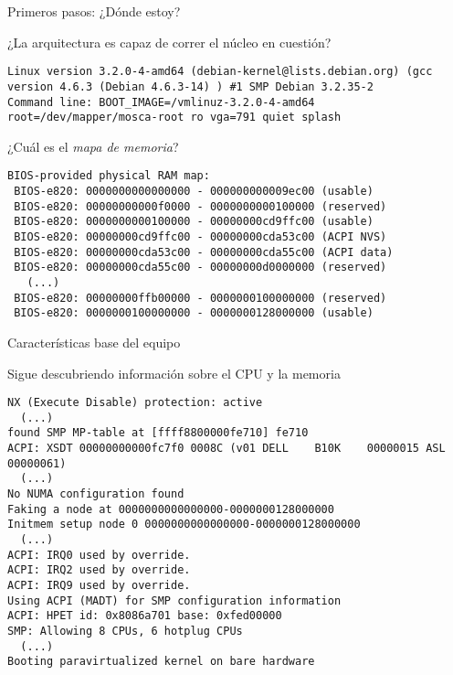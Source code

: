 \documentclass[presentation]{beamer}
\begin{document}
\begin{frame}[label={sec:org8016288},fragile]{Primeros pasos: ¿Dónde estoy?}
 \begin{center}
¿La arquitectura es capaz de correr el núcleo en cuestión?
\end{center}
\begin{verbatim}
Linux version 3.2.0-4-amd64 (debian-kernel@lists.debian.org) (gcc version 4.6.3 (Debian 4.6.3-14) ) #1 SMP Debian 3.2.35-2
Command line: BOOT_IMAGE=/vmlinuz-3.2.0-4-amd64 root=/dev/mapper/mosca-root ro vga=791 quiet splash
\end{verbatim}
\begin{center}
¿Cuál es el \emph{mapa de memoria}?
\end{center}
\begin{verbatim}
BIOS-provided physical RAM map:
 BIOS-e820: 0000000000000000 - 000000000009ec00 (usable)
 BIOS-e820: 00000000000f0000 - 0000000000100000 (reserved)
 BIOS-e820: 0000000000100000 - 00000000cd9ffc00 (usable)
 BIOS-e820: 00000000cd9ffc00 - 00000000cda53c00 (ACPI NVS)
 BIOS-e820: 00000000cda53c00 - 00000000cda55c00 (ACPI data)
 BIOS-e820: 00000000cda55c00 - 00000000d0000000 (reserved)
   (...)
 BIOS-e820: 00000000ffb00000 - 0000000100000000 (reserved)
 BIOS-e820: 0000000100000000 - 0000000128000000 (usable)
\end{verbatim}
\end{frame}

\begin{frame}[label={sec:orge6c693b},fragile]{Características base del equipo}
 \begin{center}
Sigue descubriendo información sobre el CPU y la memoria
\end{center}
\begin{verbatim}
NX (Execute Disable) protection: active
  (...)
found SMP MP-table at [ffff8800000fe710] fe710
ACPI: XSDT 00000000000fc7f0 0008C (v01 DELL    B10K    00000015 ASL  00000061)
  (...)
No NUMA configuration found
Faking a node at 0000000000000000-0000000128000000
Initmem setup node 0 0000000000000000-0000000128000000
  (...)
ACPI: IRQ0 used by override.
ACPI: IRQ2 used by override.
ACPI: IRQ9 used by override.
Using ACPI (MADT) for SMP configuration information
ACPI: HPET id: 0x8086a701 base: 0xfed00000
SMP: Allowing 8 CPUs, 6 hotplug CPUs
  (...)
Booting paravirtualized kernel on bare hardware
\end{verbatim}
\end{frame}
\end{document}
